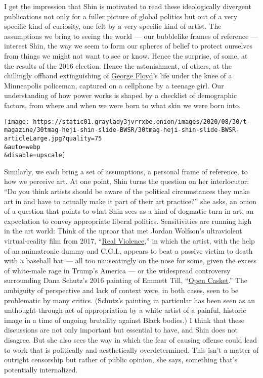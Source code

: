 I get the impression that Shin is motivated to read these ideologically
divergent publications not only for a fuller picture of global politics
but out of a very specific kind of curiosity, one felt by a very
specific kind of artist. The assumptions we bring to seeing the world
--- our bubblelike frames of reference --- interest Shin, the way we
seem to form our spheres of belief to protect ourselves from things we
might not want to see or know. Hence the surprise, of some, at the
results of the 2016 election. Hence the astonishment, of others, at the
chillingly offhand extinguishing of
\href{https://www.nytimes3xbfgragh.onion/2020/05/31/us/george-floyd-investigation.html}{George
Floyd}'s life under the knee of a Minneapolis policeman, captured on a
cellphone by a teenage girl. Our understanding of how power works is
shaped by a checklist of demographic factors, from where and when we
were born to what skin we were born into.

\texttt{[image: https://static01.graylady3jvrrxbe.onion/images/2020/08/30/t-magazine/30tmag-heji-shin-slide-BWSR/30tmag-heji-shin-slide-BWSR-articleLarge.jpg?quality=75\\\&auto=webp\\\&disable=upscale]}

Similarly, we each bring a set of assumptions, a personal frame of
reference, to how we perceive art. At one point, Shin turns the question
on her interlocutor: ``Do you think artists should be aware of the
political circumstances they make art in and have to actually make it
part of their art practice?'' she asks, an onion of a question that
points to what Shin sees as a kind of dogmatic turn in art, an
expectation to convey appropriate liberal politics. Sensitivities are
running high in the art world: Think of the uproar that met Jordan
Wolfson's ultraviolent virtual-reality film from 2017,
``\href{https://www.nytimes3xbfgragh.onion/2017/04/28/arts/design/art-goes-political-but-will-that-fly-on-the-london-market.html}{Real
Violence},'' in which the artist, with the help of an animatronic dummy
and C.G.I., appears to beat a passive victim to death with a baseball
bat --- all too nauseatingly on the nose for some, given the excess of
white-male rage in Trump's America --- or the widespread controversy
surrounding Dana Schutz's 2016 painting of Emmett Till,
``\href{https://www.nytimes3xbfgragh.onion/2017/03/21/arts/design/painting-of-emmett-till-at-whitney-biennial-draws-protests.html}{Open
Casket}.'' The ambiguity of perspective and lack of context were, in
both cases, seen to be problematic by many critics. (Schutz's painting
in particular has been seen as an unthought-through act of appropriation
by a white artist of a painful, historic image in a time of ongoing
brutality against Black bodies.) I think that these discussions are not
only important but essential to have, and Shin does not disagree. But
she also sees the way in which the fear of causing offense could lead to
work that is politically and aesthetically overdetermined. This isn't a
matter of outright censorship but rather of public opinion, she says,
something that's potentially internalized.

